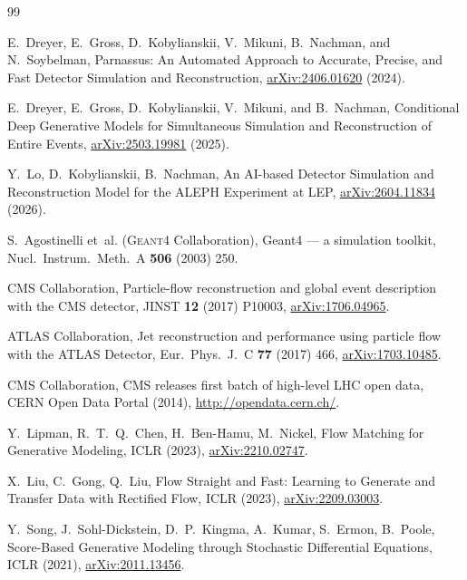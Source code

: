 \documentclass[11pt,a4paper]{article}          %
\begin{document}
\begin{thebibliography}{99}

  E.~Dreyer, E.~Gross, D.~Kobylianskii, V.~Mikuni, B.~Nachman, and
  N.~Soybelman,
  Parnassus: An Automated Approach to Accurate, Precise, and Fast Detector
  Simulation and Reconstruction,
  \href{https://arxiv.org/abs/2406.01620}{arXiv:2406.01620} (2024).

  E.~Dreyer, E.~Gross, D.~Kobylianskii, V.~Mikuni, and B.~Nachman,
  Conditional Deep Generative Models for Simultaneous Simulation and
  Reconstruction of Entire Events,
  \href{https://arxiv.org/abs/2503.19981}{arXiv:2503.19981} (2025).

  Y.~Lo, D.~Kobylianskii, B.~Nachman,
  An AI-based Detector Simulation and Reconstruction Model for the ALEPH Experiment at LEP,
  \href{https://arxiv.org/abs/2604.11834}{arXiv:2604.11834} (2026).

  S.~Agostinelli et~al. (\textsc{Geant4} Collaboration),
  Geant4 --- a simulation toolkit,
  Nucl.\ Instrum.\ Meth.\ A \textbf{506} (2003) 250.

  CMS Collaboration,
  Particle-flow reconstruction and global event description with the CMS
  detector,
  JINST \textbf{12} (2017) P10003,
  \href{https://arxiv.org/abs/1706.04965}{arXiv:1706.04965}.

  ATLAS Collaboration,
  Jet reconstruction and performance using particle flow with the ATLAS
  Detector,
  Eur.\ Phys.\ J.\ C \textbf{77} (2017) 466,
  \href{https://arxiv.org/abs/1703.10485}{arXiv:1703.10485}.

  CMS Collaboration,
  CMS releases first batch of high-level LHC open data,
  CERN Open Data Portal (2014),
  \url{http://opendata.cern.ch/}.

  Y.~Lipman, R.~T.~Q.~Chen, H.~Ben-Hamu, M.~Nickel,
  Flow Matching for Generative Modeling,
  ICLR (2023),
  \href{https://arxiv.org/abs/2210.02747}{arXiv:2210.02747}.

  X.~Liu, C.~Gong, Q.~Liu,
  Flow Straight and Fast: Learning to Generate and Transfer Data with
  Rectified Flow,
  ICLR (2023),
  \href{https://arxiv.org/abs/2209.03003}{arXiv:2209.03003}.

  Y.~Song, J.~Sohl-Dickstein, D.~P.~Kingma, A.~Kumar, S.~Ermon, B.~Poole,
  Score-Based Generative Modeling through Stochastic Differential Equations,
  ICLR (2021),
  \href{https://arxiv.org/abs/2011.13456}{arXiv:2011.13456}.


\end{thebibliography}
\end{document}
